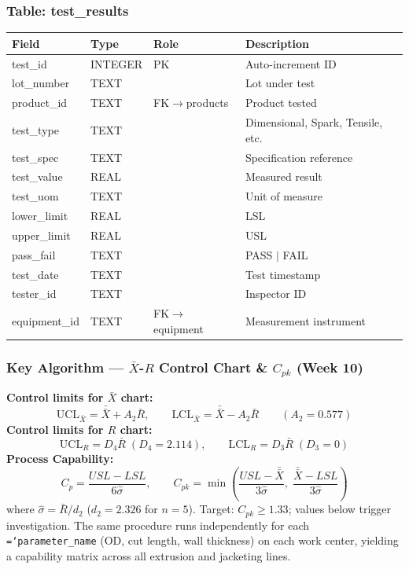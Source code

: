 \documentclass[11pt]{article}
\newcommand{\tfield}[1]{\texttt{\hyphenchar\font=`\-\relax #1}}
\begin{document}
\subsubsection*{Table: test\_results}
\begin{table}[H]\centering\small
\begin{tabular}{@{} l l l L{5.0cm} @{}}
\toprule
\textbf{Field} & \textbf{Type} & \textbf{Role} & \textbf{Description} \\
\midrule
test\_id       & INTEGER & PK  & Auto-increment ID \\
lot\_number    & TEXT    &     & Lot under test \\
product\_id    & TEXT    & FK$\to$products & Product tested \\
test\_type     & TEXT    &     & Dimensional, Spark, Tensile, etc. \\
test\_spec     & TEXT    &     & Specification reference \\
test\_value    & REAL    &     & Measured result \\
test\_uom      & TEXT    &     & Unit of measure \\
lower\_limit   & REAL    &     & LSL \\
upper\_limit   & REAL    &     & USL \\
pass\_fail     & TEXT    &     & PASS $\mid$ FAIL \\
test\_date     & TEXT    &     & Test timestamp \\
tester\_id     & TEXT    &     & Inspector ID \\
equipment\_id  & TEXT    & FK$\to$equipment & Measurement instrument \\
\bottomrule
\end{tabular}
\end{table}

\subsubsection*{Key Algorithm --- $\bar{X}$-$R$ Control Chart \& $C_{pk}$ (Week 10)}

\begin{eqbox}[F7 --- $\bar{X}$-$R$ Control Chart ($n=5$ subgroups)]
\textbf{Control limits for $\bar{X}$ chart:}
\[
\text{UCL}_{\bar{X}} = \bar{\bar{X}} + A_2 \bar{R}, \qquad \text{LCL}_{\bar{X}} = \bar{\bar{X}} - A_2 \bar{R} \qquad (A_2 = 0.577)
\]
\textbf{Control limits for $R$ chart:}
\[
\text{UCL}_R = D_4 \bar{R} \;(D_4 = 2.114), \qquad \text{LCL}_R = D_3 \bar{R} \;(D_3 = 0)
\]
\textbf{Process Capability:}
\[
C_p = \frac{USL - LSL}{6\hat{\sigma}}, \qquad C_{pk} = \min\!\left(\frac{USL - \bar{\bar{X}}}{3\hat{\sigma}},\; \frac{\bar{\bar{X}} - LSL}{3\hat{\sigma}}\right)
\]
where $\hat{\sigma} = \bar{R}/d_2$ ($d_2 = 2.326$ for $n=5$).  Target: $C_{pk} \geq 1.33$; values below trigger investigation.  The same procedure runs independently for each \tfield{parameter\_name} (OD, cut length, wall thickness) on each work center, yielding a capability matrix across all extrusion and jacketing lines.
\end{eqbox}
\end{document}
